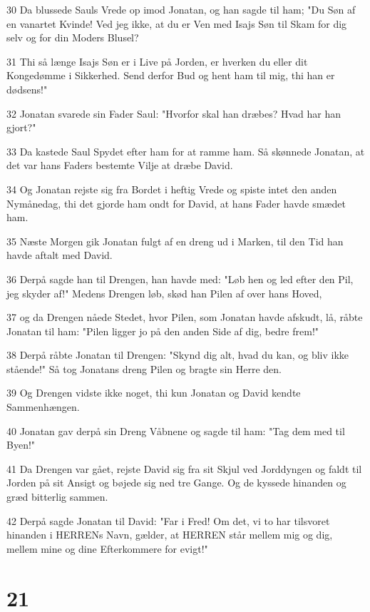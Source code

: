 \par 30 Da blussede Sauls Vrede op imod Jonatan, og han sagde til ham; "Du Søn af en vanartet Kvinde! Ved jeg ikke, at du er Ven med Isajs Søn til Skam for dig selv og for din Moders Blusel?
\par 31 Thi så længe Isajs Søn er i Live på Jorden, er hverken du eller dit Kongedømme i Sikkerhed. Send derfor Bud og hent ham til mig, thi han er dødsens!"
\par 32 Jonatan svarede sin Fader Saul: "Hvorfor skal han dræbes? Hvad har han gjort?"
\par 33 Da kastede Saul Spydet efter ham for at ramme ham. Så skønnede Jonatan, at det var hans Faders bestemte Vilje at dræbe David.
\par 34 Og Jonatan rejste sig fra Bordet i heftig Vrede og spiste intet den anden Nymånedag, thi det gjorde ham ondt for David, at hans Fader havde smædet ham.
\par 35 Næste Morgen gik Jonatan fulgt af en dreng ud i Marken, til den Tid han havde aftalt med David.
\par 36 Derpå sagde han til Drengen, han havde med: "Løb hen og led efter den Pil, jeg skyder af!" Medens Drengen løb, skød han Pilen af over hans Hoved,
\par 37 og da Drengen nåede Stedet, hvor Pilen, som Jonatan havde afskudt, lå, råbte Jonatan til ham: "Pilen ligger jo på den anden Side af dig, bedre frem!"
\par 38 Derpå råbte Jonatan til Drengen: "Skynd dig alt, hvad du kan, og bliv ikke stående!" Så tog Jonatans dreng Pilen og bragte sin Herre den.
\par 39 Og Drengen vidste ikke noget, thi kun Jonatan og David kendte Sammenhængen.
\par 40 Jonatan gav derpå sin Dreng Våbnene og sagde til ham: "Tag dem med til Byen!"
\par 41 Da Drengen var gået, rejste David sig fra sit Skjul ved Jorddyngen og faldt til Jorden på sit Ansigt og bøjede sig ned tre Gange. Og de kyssede hinanden og græd bitterlig sammen.
\par 42 Derpå sagde Jonatan til David: "Far i Fred! Om det, vi to har tilsvoret hinanden i HERRENs Navn, gælder, at HERREN står mellem mig og dig, mellem mine og dine Efterkommere for evigt!"

\chapter{21}

